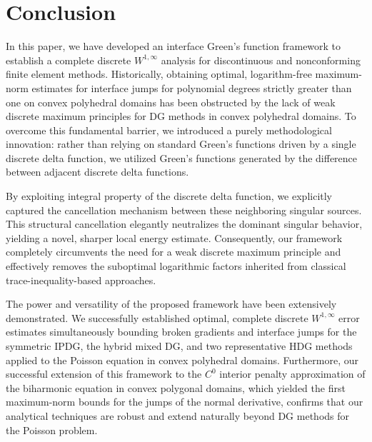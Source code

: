 \documentclass[1996/10/24]{amsart}
\theoremstyle{definition}
\numberwithin{equation}{section}
\begin{document}
\section{Conclusion}\label{sec6}
In this paper, we have developed an interface Green's function framework to establish a complete discrete $W^{1,\infty}$ analysis for discontinuous and nonconforming finite element methods. Historically, obtaining optimal, logarithm-free maximum-norm estimates for interface jumps for polynomial degrees strictly greater than one on convex polyhedral domains has been obstructed by the lack of weak discrete maximum principles for DG methods in convex polyhedral domains. To overcome this fundamental barrier, we introduced a purely methodological innovation: rather than relying on standard Green's functions driven by a single discrete delta function, we utilized Green's functions generated by the difference between adjacent discrete delta functions.

By exploiting integral property of the discrete delta function, we explicitly captured the cancellation mechanism between these neighboring singular sources. This structural cancellation elegantly neutralizes the dominant singular behavior, yielding a novel, sharper local energy estimate. Consequently, our framework completely circumvents the need for a weak discrete maximum principle and effectively removes the suboptimal logarithmic factors inherited from classical trace-inequality-based approaches.

The power and versatility of the proposed framework have been extensively demonstrated. We successfully established optimal, complete discrete $W^{1,\infty}$ error estimates simultaneously bounding broken gradients and interface jumps for the symmetric IPDG, the hybrid mixed DG, and two representative HDG methods applied to the Poisson equation in convex polyhedral domains. Furthermore, our successful extension of this framework to the $C^0$ interior penalty approximation of the biharmonic equation in convex polygonal domains, which yielded the first maximum-norm bounds for the jumps of the normal derivative, confirms that our analytical techniques are robust and extend naturally beyond DG methods for the Poisson problem.

\smallskip
\smallskip

\appendix

\section{}
\end{document}
